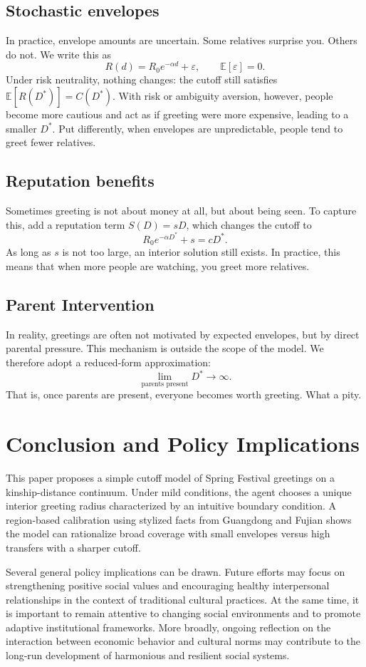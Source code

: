 \documentclass[AER]{AEA}
\begin{document}
\subsection{Stochastic envelopes}
In practice, envelope amounts are uncertain. Some relatives surprise you. Others do not. We write this as
\[
R(d)=R_0 e^{-\alpha d}+\varepsilon,\qquad \mathbb{E}[\varepsilon]=0.
\]
Under risk neutrality, nothing changes: the cutoff still satisfies $\mathbb{E}[R(D^*)]=C(D^*)$. With risk or ambiguity aversion, however, people become more cautious and act as if greeting were more expensive, leading to a smaller $D^*$. Put differently, when envelopes are unpredictable, people tend to greet fewer relatives.

\subsection{Reputation benefits}
Sometimes greeting is not about money at all, but about being seen. To capture this, add a reputation term $S(D)=sD$, which changes the cutoff to
\[
R_0 e^{-\alpha D^*}+s=cD^*.
\]
As long as $s$ is not too large, an interior solution still exists. In practice, this means that when more people are watching, you greet more relatives.

\subsection{Parent Intervention}
In reality, greetings are often not motivated by expected envelopes, but by direct parental pressure. This mechanism is outside the scope of the model. We therefore adopt a reduced-form approximation:
\[
\lim_{\text{parents present}} D^* \to \infty.
\]
That is, once parents are present, everyone becomes worth greeting. What a pity.

\section{Conclusion and Policy Implications}
This paper proposes a simple cutoff model of Spring Festival greetings on a kinship-distance continuum. Under mild conditions, the agent chooses a unique interior greeting radius characterized by an intuitive boundary condition. A region-based calibration using stylized facts from Guangdong and Fujian shows the model can rationalize broad coverage with small envelopes versus high transfers with a sharper cutoff. 

Several general policy implications can be drawn. Future efforts may focus on strengthening positive social values and encouraging healthy interpersonal relationships in the context of traditional cultural practices. At the same time, it is important to remain attentive to changing social environments and to promote adaptive institutional frameworks. More broadly, ongoing reflection on the interaction between economic behavior and cultural norms may contribute to the long-run development of harmonious and resilient social systems.
\end{document}
